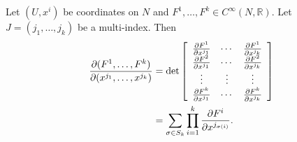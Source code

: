 \begin{enumerate}
{    Let $(U, x^i)$ be coordinates on $N$ and
    $F^1, \dots, F^k \in C^\infty(N, \mathbb{R})$. Let
    $J = (j_1, \dots, j_k)$ be a multi-index. Then
    \begin{align*}
       \frac{\partial (F^1, \dots, F^k)}
            {\partial (x^{j_1}, \dots, x^{j_k})}
    &= \det
       \left[
         \begin{array}{c c c}
           \frac{\partial F^1}{\partial x^{j_1}}
         & \cdots
         & \frac{\partial F^1}{\partial x^{j_k}} \\
           \frac{\partial F^2}{\partial x^{j_1}}
         & \cdots
         & \frac{\partial F^2}{\partial x^{j_k}} \\
           \vdots & \vdots & \vdots \\
           \frac{\partial F^k}{\partial x^{j_1}}
         & \cdots
         & \frac{\partial F^k}{\partial x^{j_k}}
         \end{array}
       \right] \\
    &= \sum_{\sigma \in S_k}
         \prod_{i=1}^k
           \frac{\partial F^i}{\partial x^{j_{\sigma(i)}}}.
    \end{align*}

}
\end{enumerate}
